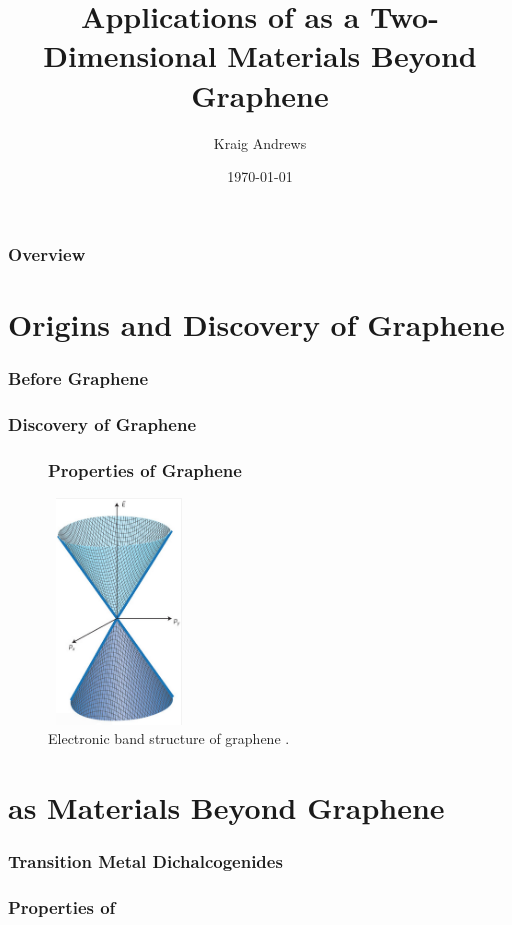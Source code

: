 \documentclass{beamer}
\title[2D Materials Beyond Graphene]{Applications of \ch{MoS2} as a Two-Dimensional Materials Beyond Graphene} %
\author{Kraig Andrews} %
\institute[Wayne State University] %
{
Wayne State University \\ %
\medskip
\textit{kraig.andrews@wayne.edu} %
}
\date{\today} %
\begin{document}
\begin{frame}
\titlepage %
\end{frame}

\begin{frame}
\frametitle{Overview} 
\tableofcontents 
\end{frame}

\section{Origins and Discovery of Graphene}
\begin{frame}
\frametitle{Before Graphene}
\end{frame}

\begin{frame}
\frametitle{Discovery of Graphene}
\end{frame}

\begin{frame}
\begin{figure}
\frametitle{Properties of Graphene}
\includegraphics[height=6cm, width=3.75cm]{../present_figs/graphenebandgap}
\caption{Electronic band structure of graphene \cite{Fuhrer2010}.}
\end{figure}
\end{frame}

\section{ as Materials Beyond Graphene}
\begin{frame}
\frametitle{Transition Metal Dichalcogenides}
\end{frame}

\begin{frame}
\frametitle{Properties of }
\end{frame}
\end{document}
